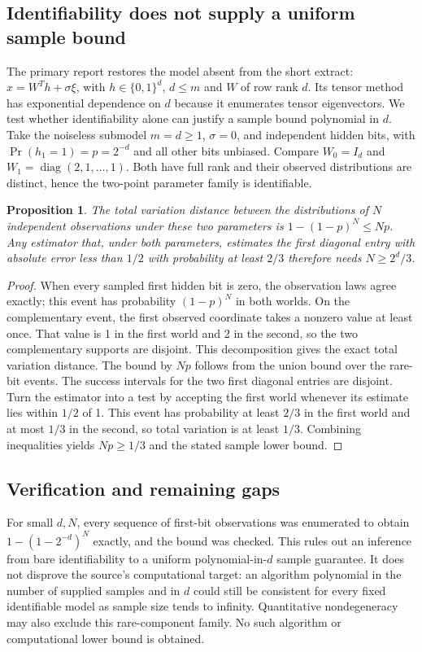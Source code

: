 \documentclass[11pt]{article}
\newtheorem{proposition}{Proposition}
\begin{document}
\subsection{Identifiability does not supply a uniform sample bound}
The primary report restores the model absent from the short extract: $x=W^Th+\sigma\xi$, with $h\in\{0,1\}^d$, $d\le m$ and $W$ of row rank $d$. Its tensor method has exponential dependence on $d$ because it enumerates tensor eigenvectors. We test whether identifiability alone can justify a sample bound polynomial in $d$.
Take the noiseless submodel $m=d\ge1$, $\sigma=0$, and independent hidden bits, with $\Pr(h_1=1)=p=2^{-d}$ and all other bits unbiased. Compare $W_0=I_d$ and $W_1=\operatorname{diag}(2,1,\ldots,1)$. Both have full rank and their observed distributions are distinct, hence the two-point parameter family is identifiable.
\begin{proposition}
The total variation distance between the distributions of $N$ independent observations under these two parameters is $1-(1-p)^N\le Np$. Any estimator that, under both parameters, estimates the first diagonal entry with absolute error less than $1/2$ with probability at least $2/3$ therefore needs $N\ge2^d/3$.
\end{proposition}
\begin{proof}
When every sampled first hidden bit is zero, the observation laws agree exactly; this event has probability $(1-p)^N$ in both worlds. On the complementary event, the first observed coordinate takes a nonzero value at least once. That value is 1 in the first world and 2 in the second, so the two complementary supports are disjoint. This decomposition gives the exact total variation distance. The bound by $Np$ follows from the union bound over the rare-bit events.
The success intervals for the two first diagonal entries are disjoint. Turn the estimator into a test by accepting the first world whenever its estimate lies within $1/2$ of 1. This event has probability at least $2/3$ in the first world and at most $1/3$ in the second, so total variation is at least $1/3$. Combining inequalities yields $Np\ge1/3$ and the stated sample lower bound.
\end{proof}
\subsection{Verification and remaining gaps}
For small $d,N$, every sequence of first-bit observations was enumerated to obtain $1-(1-2^{-d})^N$ exactly, and the bound was checked. This rules out an inference from bare identifiability to a uniform polynomial-in-$d$ sample guarantee. It does not disprove the source's computational target: an algorithm polynomial in the number of supplied samples and in $d$ could still be consistent for every fixed identifiable model as sample size tends to infinity. Quantitative nondegeneracy may also exclude this rare-component family. No such algorithm or computational lower bound is obtained.
\end{document}
